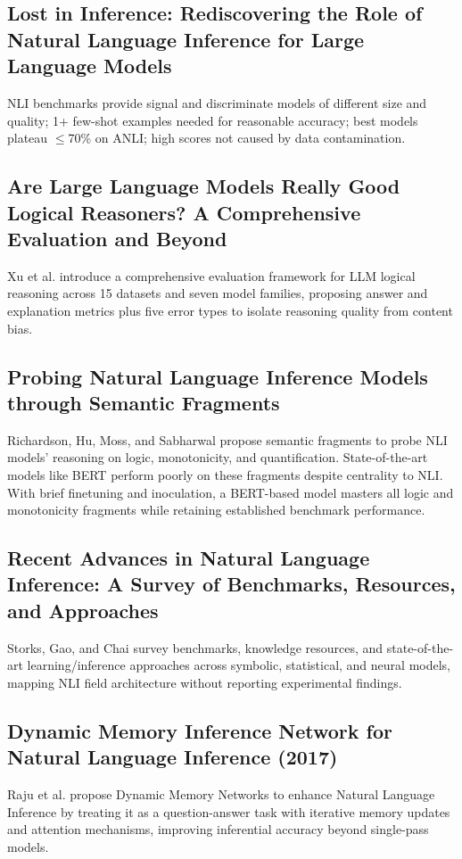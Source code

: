 \documentclass[runningheads]{llncs}
\begin{document}
\subsection{Lost in Inference: Rediscovering the Role of Natural Language Inference for Large Language Models}
NLI benchmarks provide signal and discriminate models of different size and quality; 1+ few-shot examples needed for reasonable accuracy; best models plateau $\leq$70\% on ANLI; high scores not caused by data contamination. \cite{madaan2024lost}

\subsection{Are Large Language Models Really Good Logical Reasoners? A Comprehensive Evaluation and Beyond}
Xu et al. introduce a comprehensive evaluation framework for LLM logical reasoning across 15 datasets and seven model families, proposing answer and explanation metrics plus five error types to isolate reasoning quality from content bias. \cite{xu2023large}

\subsection{Probing Natural Language Inference Models through Semantic Fragments}
Richardson, Hu, Moss, and Sabharwal propose semantic fragments to probe NLI models' reasoning on logic, monotonicity, and quantification. State-of-the-art models like BERT perform poorly on these fragments despite centrality to NLI. With brief finetuning and inoculation, a BERT-based model masters all logic and monotonicity fragments while retaining established benchmark performance. \cite{richardson2020probing}

\subsection{Recent Advances in Natural Language Inference: A Survey of Benchmarks, Resources, and Approaches}
Storks, Gao, and Chai survey benchmarks, knowledge resources, and state-of-the-art learning/inference approaches across symbolic, statistical, and neural models, mapping NLI field architecture without reporting experimental findings. \cite{storks2019recent}

\subsection{Dynamic Memory Inference Network for Natural Language Inference (2017)}
Raju et al. propose Dynamic Memory Networks to enhance Natural Language Inference by treating it as a question-answer task with iterative memory updates and attention mechanisms, improving inferential accuracy beyond single-pass models. \cite{raju2017dynamic}
\end{document}
